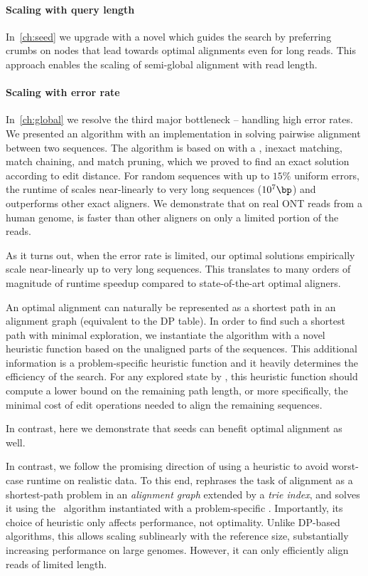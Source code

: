 \paragraph{Scaling with query length}
In~\cref{ch:seed} we upgrade \astarix with a novel \sh which guides the \A
search by preferring crumbs on nodes that lead towards optimal alignments even
for long reads. This approach enables the scaling of semi-global alignment with
read length.

\paragraph{Scaling with error rate}
In~\cref{ch:global} we resolve the third major bottleneck -- handling high error
rates. We presented an algorithm with an implementation in \astarpa solving
pairwise alignment between two sequences. The algorithm is based on \A with a
\sh, inexact matching, match chaining, and match pruning, which we proved to
find an exact solution according to edit distance. For random sequences with up
to $15\%$ uniform errors, the runtime of \astarpa scales near-linearly to very
long sequences ($10^7\bp$) and outperforms other exact aligners. We demonstrate
that on real ONT reads from a human genome, \astarpa is faster than other
aligners on only a limited portion of the reads.

As it turns out, when the error rate is limited, our optimal solutions
empirically scale near-linearly up to very long sequences. This translates to
many orders of magnitude of runtime speedup compared to state-of-the-art optimal
aligners.

An optimal alignment can naturally be represented as a shortest path in an
alignment graph (equivalent to the DP table). In order to find such a shortest
path with minimal exploration, we instantiate the \A algorithm with a novel
heuristic function based on the unaligned parts of the sequences. This
additional information is a problem-specific heuristic function and it heavily
determines the efficiency of the search. For any explored state by \A, this
heuristic function should compute a lower bound on the remaining path length, or
more specifically, the minimal cost of edit operations needed to align the
remaining sequences.

In contrast, here we demonstrate that seeds can benefit optimal alignment as
well.

In contrast, we follow the promising direction of using a heuristic to avoid
worst-case runtime on realistic data. To this end, \astarix rephrases the task
of alignment as a shortest-path problem in an \emph{alignment graph} extended by
a \emph{trie index}, and solves it using the \A~algorithm instantiated with a
problem-specific \prefixh. Importantly, its choice of heuristic only affects
performance, not optimality.
%
Unlike DP-based algorithms, this \prefixh allows scaling sublinearly with the
reference size, substantially increasing performance on large genomes. However,
it can only efficiently align reads of limited length.


